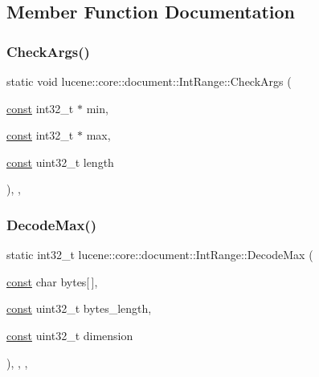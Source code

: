 \subsection{Member Function Documentation}
\mbox{\label{classlucene_1_1core_1_1document_1_1IntRange_a5b20608bad7100f0a7254a4fdad3898e}} 
\subsubsection{\texorpdfstring{Check\+Args()}{CheckArgs()}}
{\footnotesize\ttfamily static void lucene\+::core\+::document\+::\+Int\+Range\+::\+Check\+Args (\begin{DoxyParamCaption}\item[{\mbox{\hyperlink{ZlibCrc32_8h_a2c212835823e3c54a8ab6d95c652660e}{const}} int32\+\_\+t $\ast$}]{min,  }\item[{\mbox{\hyperlink{ZlibCrc32_8h_a2c212835823e3c54a8ab6d95c652660e}{const}} int32\+\_\+t $\ast$}]{max,  }\item[{\mbox{\hyperlink{ZlibCrc32_8h_a2c212835823e3c54a8ab6d95c652660e}{const}} uint32\+\_\+t}]{length }\end{DoxyParamCaption})\hspace{0.3cm}{\ttfamily [inline]}, {\ttfamily [static]}, {\ttfamily [private]}}

\mbox{\label{classlucene_1_1core_1_1document_1_1IntRange_a2f9b2a70823aa0ae838201b661e3cf9e}} 
\subsubsection{\texorpdfstring{Decode\+Max()}{DecodeMax()}}
{\footnotesize\ttfamily static int32\+\_\+t lucene\+::core\+::document\+::\+Int\+Range\+::\+Decode\+Max (\begin{DoxyParamCaption}\item[{\mbox{\hyperlink{ZlibCrc32_8h_a2c212835823e3c54a8ab6d95c652660e}{const}} char}]{bytes\mbox{[}$\,$\mbox{]},  }\item[{\mbox{\hyperlink{ZlibCrc32_8h_a2c212835823e3c54a8ab6d95c652660e}{const}} uint32\+\_\+t}]{bytes\+\_\+length,  }\item[{\mbox{\hyperlink{ZlibCrc32_8h_a2c212835823e3c54a8ab6d95c652660e}{const}} uint32\+\_\+t}]{dimension }\end{DoxyParamCaption})\hspace{0.3cm}{\ttfamily [inline]}, {\ttfamily [static]}, {\ttfamily [private]}, {\ttfamily [noexcept]}}

